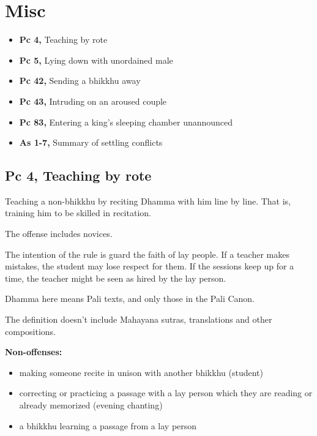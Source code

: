 \chapter{Misc}

\begin{itemize}
\tightlist
\item
  \textbf{Pc 4,} Teaching by rote
\item
  \textbf{Pc 5,} Lying down with unordained male
\item
  \textbf{Pc 42,} Sending a bhikkhu away
\item
  \textbf{Pc 43,} Intruding on an aroused couple
\item
  \textbf{Pc 83,} Entering a king's sleeping chamber unannounced
\item
  \textbf{As 1-7,} Summary of settling conflicts
\end{itemize}

\section{Pc 4, Teaching by rote}

\begin{multicols}{2}

Teaching a non-bhikkhu by reciting Dhamma with him line by line. That
is, training him to be skilled in recitation.

The offense includes novices.

The intention of the rule is guard the faith of lay people. If a teacher
makes mistakes, the student may lose respect for them. If the sessions
keep up for a time, the teacher might be seen as hired by the lay
person.

Dhamma here means Pali texts, and only those in the Pali Canon.

The definition doesn't include Mahayana sutras, translations and other
compositions.

\textbf{Non-offenses:}

\begin{itemize}
\tightlist
\item
  making someone recite in unison with another bhikkhu (student)
\item
  correcting or practicing a passage with a lay person which they are
  reading or already memorized (evening chanting)
\item
  a bhikkhu learning a passage from a lay person
\end{itemize}

\end{multicols}

